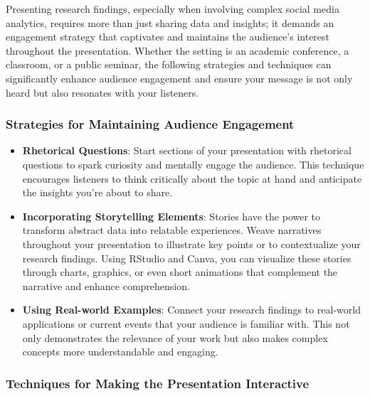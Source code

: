 \documentclass[
]{book}
\begin{document}
Presenting research findings, especially when involving complex social media analytics, requires more than just sharing data and insights; it demands an engagement strategy that captivates and maintains the audience's interest throughout the presentation. Whether the setting is an academic conference, a classroom, or a public seminar, the following strategies and techniques can significantly enhance audience engagement and ensure your message is not only heard but also resonates with your listeners.

\hypertarget{strategies-for-maintaining-audience-engagement}{%
\subsubsection*{Strategies for Maintaining Audience Engagement}\label{strategies-for-maintaining-audience-engagement}}

\begin{itemize}
\item
  \textbf{Rhetorical Questions}: Start sections of your presentation with rhetorical questions to spark curiosity and mentally engage the audience. This technique encourages listeners to think critically about the topic at hand and anticipate the insights you're about to share.
\item
  \textbf{Incorporating Storytelling Elements}: Stories have the power to transform abstract data into relatable experiences. Weave narratives throughout your presentation to illustrate key points or to contextualize your research findings. Using RStudio and Canva, you can visualize these stories through charts, graphics, or even short animations that complement the narrative and enhance comprehension.
\item
  \textbf{Using Real-world Examples}: Connect your research findings to real-world applications or current events that your audience is familiar with. This not only demonstrates the relevance of your work but also makes complex concepts more understandable and engaging.
\end{itemize}

\hypertarget{techniques-for-making-the-presentation-interactive}{%
\subsubsection*{Techniques for Making the Presentation Interactive}\label{techniques-for-making-the-presentation-interactive}}
\end{document}
